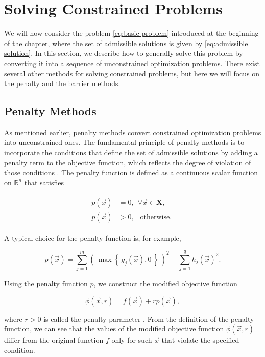 \section{Solving Constrained Problems}\label{constrained}
We will now consider the problem \ref{eq:basic problem} introduced at the beginning of the chapter, where the set of admissible solutions is given by \ref{eq:admissible solution}. In this section, we describe how to generally solve this problem by converting it into a sequence of unconstrained optimization problems. There exist several other methods for solving constrained problems, but here we will focus on the penalty and the barrier methods.

\subsection{Penalty Methods}\label{penalty method}
As mentioned earlier, penalty methods convert constrained optimization problems into unconstrained ones. The fundamental principle of penalty methods is to incorporate the conditions that define the set of admissible solutions by adding a penalty term to the objective function, which reflects the degree of violation of those conditions \cite{Bert}. The penalty function is defined as a continuous scalar function on $ \mathbb{R}^n $ that satisfies

\begin{align}
	\begin{split}
		p(\vec{x}) &= 0, \ \ \forall \vec{x} \in \mathbf{X},\\[6pt]
		p(\vec{x}) &> 0, \ \ \text { otherwise. }
	\end{split}
\end{align}

A typical choice for the penalty function is, for example,

\begin{equation}\label{eq:penalty function}
	p (\vec{x}) = \sum_{j=1}^{m} \left( \, \max  \left\{ \, g_j (\vec{x}), 0 \, \right\} \, \right)^2 + \sum_{j=1}^{q} h_j (\vec{x})^2.
\end{equation}

Using the penalty function $ p $, we construct the modified objective function

\begin{equation}\label{eq:cost function with penalty}
	\phi (\vec{x}, r) = f (\vec{x}) + r p(\vec{x}),
\end{equation}

where $ r > 0 $ is called the penalty parameter \cite{Bert}. From the definition of the penalty function, we can see that the values of the modified objective function $ \phi (\vec{x}, r)$ differ from the original function $ f $ only for such $ \vec{x} $ that violate the specified condition.

